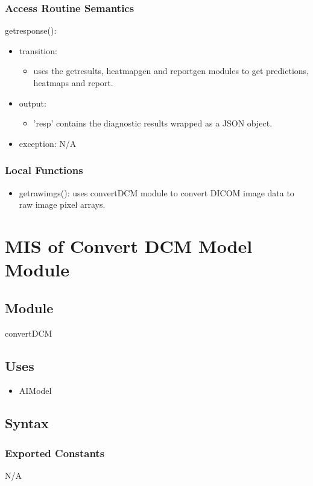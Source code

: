 \documentclass[12pt, titlepage]{article}
\begin{document}
\subsubsection{Access Routine Semantics}

\noindent getresponse():
\begin{itemize}
\item transition: \begin{itemize}
    \item uses the getresults, heatmapgen and reportgen modules to get predictions, heatmaps and report.
\end{itemize}
\item output: \begin{itemize}
    \item 'resp' contains the diagnostic results wrapped as a JSON object.
\end{itemize}
\item exception: N/A 
\end{itemize}

\subsubsection{Local Functions}
\begin{itemize}
    \item getrawimgs(): uses convertDCM module to convert DICOM image data to raw image pixel arrays.
\end{itemize}
\newpage

\section{MIS of Convert DCM Model Module} \label{Module} 
\subsection{Module}
convertDCM
\subsection{Uses}
\begin{itemize}
    \item AIModel
\end{itemize}
\subsection{Syntax}

\subsubsection{Exported Constants}
N/A
\end{document}

